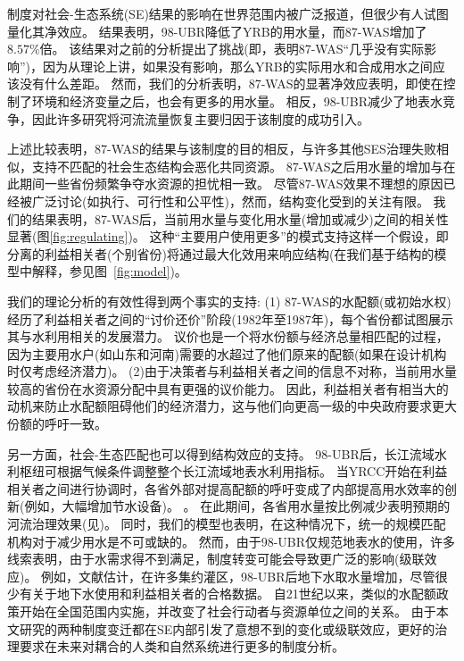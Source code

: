 \label{discussion-1}
制度对社会-生态系统(SE)结果的影响在世界范围内被广泛报道，但很少有人试图量化其净效应\cite{cumming2020a}。
结果表明，98-UBR降低了YRB的用水量，而87-WAS增加了$8.57\%$倍。
该结果对之前的分析提出了挑战(即，表明87-WAS“几乎没有实际影响”)，因为从理论上讲，如果没有影响，那么YRB的实际用水和合成用水之间应该没有什么差距\cite{abadie2015,hill2021}。
然而，我们的分析表明，87-WAS的显著净效应表明，即使在控制了环境和经济变量之后，也会有更多的用水量。
相反，98-UBR减少了地表水竞争，因此许多研究将河流流量恢复主要归因于该制度\cite{chen2021,huangang2002,an2007}的成功引入。

\label{discussion-2}
上述比较表明，87-WAS的结果与该制度的目的相反，与许多其他SES治理失败相似，支持不匹配的社会生态结构会恶化共同资源\cite{kellenberg2009,cai2016,barnes2019}。
87-WAS之后用水量的增加与在此期间一些省份频繁争夺水资源的担忧相一致。
尽管87-WAS效果不理想的原因已经被广泛讨论(如执行、可行性和公平性)，然而，结构变化受到的关注有限。
我们的结果表明，87-WAS后，当前用水量与变化用水量(增加或减少)之间的相关性显著(图\ref{fig:regulating})。
这种“主要用户使用更多”的模式支持这样一个假设，即分离的利益相关者(个别省份)将通过最大化效用来响应结构(在我们基于结构的模型中解释，参见图~\ref{fig:model})。

我们的理论分析的有效性得到两个事实的支持:
(1) 87-WAS的水配额(或初始水权)经历了利益相关者之间的“讨价还价”阶段(1982年至1987年)\cite{wang2019a, wang2019d}，每个省份都试图展示其与水利用相关的发展潜力。
议价也是一个将水份额与经济总量相匹配的过程，因为主要用水户(如山东和河南)需要的水超过了他们原来的配额(如果在设计机构时仅考虑经济潜力)\cite{zuo2020}。
(2)由于决策者与利益相关者之间的信息不对称，当前用水量较高的省份在水资源分配中具有更强的议价能力。
因此，利益相关者有相当大的动机来防止水配额阻碍他们的经济潜力，这与他们向更高一级的中央政府要求更大份额的呼吁一致\cite{wang2019a, wang2019d}。

\label{discussion-3}
另一方面，社会-生态匹配也可以得到结构效应的支持。
98-UBR后，长江流域水利枢纽可根据气候条件调整整个长江流域地表水利用指标。
当YRCC开始在利益相关者之间进行协调时，各省外部对提高配额的呼吁变成了内部提高用水效率的创新(例如，大幅增加节水设备)。
\cite{krieger1955, ostrom1990}。
在此期间，各省用水量按比例减少表明预期的河流治理效果(见)。
同时，我们的模型也表明，在这种情况下，统一的规模匹配机构对于减少用水是不可或缺的。
然而，由于98-UBR仅规范地表水的使用，许多线索表明，由于水需求得不到满足，制度转变可能会导致更广泛的影响(级联效应)。
例如，文献估计，在许多集约灌区，98-UBR后地下水取水量增加，尽管很少有关于地下水使用和利益相关者的合格数据\cite{sun2022b}。
自21世纪以来，类似的水配额政策开始在全国范围内实施，并改变了社会行动者与资源单位之间的关系。
由于本文研究的两种制度变迁都在SE内部引发了意想不到的变化或级联效应，更好的治理要求在未来对耦合的人类和自然系统进行更多的制度分析。

